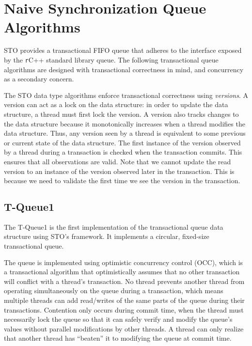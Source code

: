 \section{Naive Synchronization Queue Algorithms}

STO provides a transactional FIFO queue that adheres to the interface exposed by the \texttt
r{C++} standard library queue. The following transactional queue algorithms are designed with transactional correctness in mind, and concurrency as a secondary concern. 

The STO data type algorithms enforce transactional correctness using \emph{versions}. A version can act as a lock on the data structure: in order to update the data structure, a thread must first lock the version. A version also tracks changes to the data structure because it monotonically increases when a thread modifies the data structure. Thus, any version seen by a thread is equivalent to some previous or current state of the data structure. The first instance of the version observed by a thread during a transaction is checked when the transaction commits. This ensures that all observations are valid. Note that we cannot update the read version to an instance of the version observed later in the transaction. This is because we need to validate the first time we see the version in the transaction. 

\subsection{T-Queue1}
The T-Queue1 is the first implementation of the transactional queue data structure using STO's framework. It implements a circular, fixed-size transactional queue.

The queue is implemented using optimistic concurrency control (OCC), which is a transactional algorithm that optimistically assumes that no other transaction will conflict with a thread's transaction. No thread prevents another thread from operating simultaneously on the queue during a transaction, which means multiple threads can add read/writes of the same parts of the queue during their transactions. Contention only occurs during commit time, when the thread must necessarily lock the queue so that it can safely verify and modify the queue's values without parallel modifications by other threads. A thread can only realize that another thread has “beaten” it to modifying the queue at commit time.

